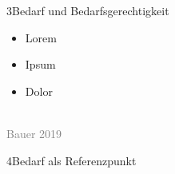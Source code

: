 \documentclass[xcolor=table,9pt,aspectratio=169]{beamer}
\begin{document}
\begin{frame}{\vspace*{10mm}3\hspace*{1em}Bedarf und Bedarfsgerechtigkeit}
\begin{multicols}{2}
\begin{itemize}
   \item Lorem
   \item Ipsum
   \item Dolor
\end{itemize}
\vfill

\begin{center}
   \vspace{1cm}
   \\
   \footnotesize{\textcolor{gray}{Bauer 2019}}
   \vspace{1cm}
\end{center}
\end{multicols}
\end{frame}


\begin{frame}
\begin{overlayarea}{\textwidth}{0.81\paperheight}{
   \vspace*{11mm}
   \textcolor{uolblue}
   {4\hspace*{1em}Bedarf als Referenzpunkt}
}
\vspace*{7mm}
\end{overlayarea}
\end{frame}
\end{document}
